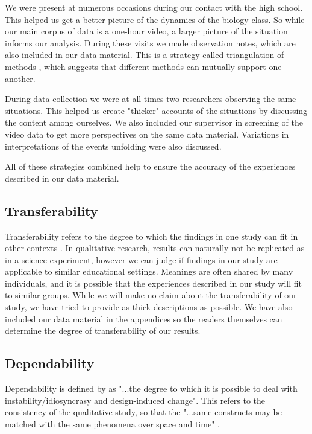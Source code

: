 We were present at numerous occasions during our contact with the high school. This helped us get a better picture of the dynamics of the biology class. So while our main corpus of data is a one-hour video, a larger picture of the situation informs our analysis. During these visits we made observation notes, which are also included in our data material. This is a strategy called triangulation of methods \citep{baxter1997evaluating}, which suggests that different methods can mutually support one another. 

During data collection we were at all times two researchers observing the same situations. This helped us create "thicker" \citep{geertz1973interpretation} accounts of the situations by discussing the content among ourselves. We also included our supervisor in screening of the video data to get more perspectives on the same data material. Variations in interpretations of the events unfolding were also discussed.

All of these strategies combined help to ensure the accuracy of the experiences described in our data material. 

\subsection{Transferability}
Transferability refers to the degree to which the findings in one study can fit in other contexts \citep{baxter1997evaluating}. In qualitative research, results can naturally not be replicated as in a science experiment, however we can judge if findings in our study are applicable to similar educational settings. Meanings are often shared by many individuals, and it is possible that the experiences described in our study will fit to similar groups. 
While we will make no claim about the transferability of our study, we have tried to provide as thick descriptions as possible. We have also included our data material in the appendices so the readers themselves can determine the degree of transferability of our results. 

\subsection{Dependability}
Dependability is defined by \citet[p. 516]{baxter1997evaluating} as "...the degree to which it is possible to deal with instability/idiosyncrasy and design-induced change". This refers to the consistency of the qualitative study, so that the "...same constructs may be matched with the same phenomena over space and time" \citep[p. 516]{baxter1997evaluating}. 

